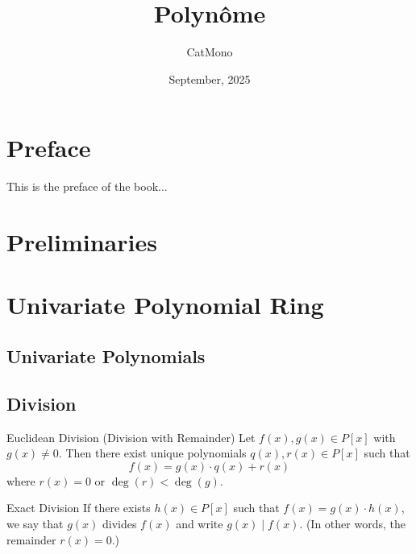 \documentclass[11pt]{elegantbook}
\title{Polynôme} %
\author{CatMono} %
\date{September, 2025} %
\begin{document}
\maketitle %

\frontmatter        %
\tableofcontents    %

\chapter{Preface}   %
This is the preface of the book...

\mainmatter         %

\chapter{Preliminaries} %

\chapter{Univariate Polynomial Ring}
\section{Univariate Polynomials}

\section{Division}

\begin{theorem}{Euclidean Division (Division with Remainder)}
    Let \( f(x), g(x) \in P[x] \) with \( g(x) \neq 0 \). 
    Then there exist unique polynomials \( q(x), r(x) \in P[x] \) such that
    \[
    f(x) = g(x) \cdot q(x) + r(x)
    \]
    where \( r(x) = 0 \) or \( \deg(r) < \deg(g) \).
\end{theorem}

\begin{definition}{Exact Division}
    If there exists \( h(x)\in P[x] \) such that \( f(x) = g(x) \cdot h(x) \), 
    we say that \( g(x) \) divides \( f(x) \) and write \( g(x) \mid f(x) \).
    (In other words, the remainder \( r(x) = 0 \).)
\end{definition}
\end{document}
